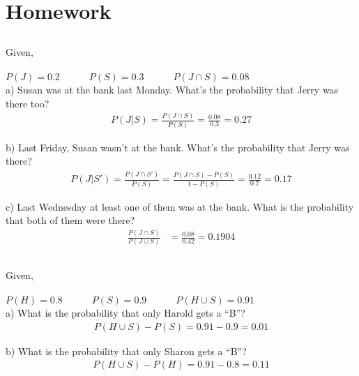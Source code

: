 \documentclass{exam}
\begin{document}
\thispagestyle{headandfoot}

\section{Homework}
\subsection {}
Given, \\ \\
$P(J) = 0.2 \quad \quad \quad P(S) = 0.3 \quad \quad \quad P(J \cap S) =  0.08$ \\

a) Susan was at the bank last Monday. What’s the probability that Jerry was there too?
\begin{align}
P(J | S) = \frac{P(J \cap S)}{P(S)} = \frac{0.08}{0.3} = 0.27
\end{align}

b) Last Friday, Susan wasn’t at the bank. What’s the probability that Jerry was there?
\begin{align}
P(J | S') = \frac{P(J \cap S')}{P(S)} = \frac{P(J \cap S)-P(S)}{1-P(S)} = \frac{0.12}{0.7} = 0.17
\end{align}

c) Last Wednesday at least one of them was at the bank. What is the probability that both of them were there?
\begin{align}
\frac{P(J \cap S)}{P(J \cup S)} &= \frac{0.08}{0.42} = 0.1904
\end{align}

\newpage

\subsection {}
Given, \\ \\
$P(H) = 0.8 \quad \quad \quad P(S) = 0.9 \quad \quad \quad P(H \cup S) =  0.91$ \\

a) What is the probability that only Harold gets a “B”?
\begin{align}
P(H \cup S) - P(S)= 0.91 - 0.9 = 0.01
\end{align}

b) What is the probability that only Sharon gets a “B”?
\begin{align}
P(H \cup S) - P(H)= 0.91 - 0.8 = 0.11
\end{align}
\end{document}
